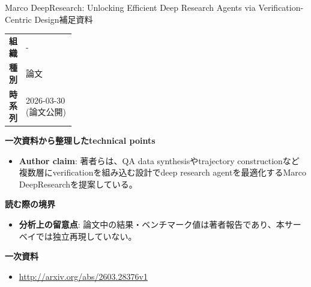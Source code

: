 \begin{technicalnote}{Marco DeepResearch: Unlocking Efficient Deep Research Agents via Verification-Centric Design}{補足資料}
\begingroup
\begin{tabularx}{\linewidth}{@{}>{\bfseries}p{0.22\linewidth}X@{}}
組織 & - \\
種別 & 論文 \\
時系列 & 2026-03-30 (論文公開) \\
\end{tabularx}
\smallskip
{\bfseries 一次資料から整理したtechnical points}
\begin{itemize}[leftmargin=1.5em,itemsep=0.35em]
\item \textbf{Author claim}: 著者らは、QA data synthesisやtrajectory constructionなど複数層にverificationを組み込む設計でdeep research agentを最適化するMarco DeepResearchを提案している。
\end{itemize}
\begin{minipage}{\linewidth}
{\bfseries 読む際の境界}
\begin{itemize}[leftmargin=1.5em,itemsep=0.35em]
\item \textbf{分析上の留意点}: 論文中の結果・ベンチマーク値は著者報告であり、本サーベイでは独立再現していない。
\end{itemize}
\begin{samepage}
{\bfseries 一次資料}
\begingroup\sloppy
\begin{itemize}[leftmargin=1.5em,itemsep=0.25em]
\item {\scriptsize\url{http://arxiv.org/abs/2603.28376v1}}
\end{itemize}
\endgroup
\end{samepage}
\end{minipage}
\endgroup
\end{technicalnote}
\medskip

